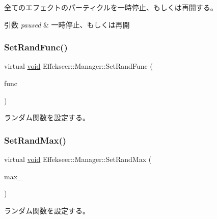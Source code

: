 全てのエフェクトのパーティクルを一時停止、もしくは再開する。 


\begin{DoxyParams}{引数}
{\em paused} & 一時停止、もしくは再開 \\
\hline
\end{DoxyParams}
\mbox{\label{class_effekseer_1_1_manager_acff5857772ae9674b6f96ffd4de28f69}} 
\subsubsection{\texorpdfstring{Set\+Rand\+Func()}{SetRandFunc()}}
{\footnotesize\ttfamily virtual \mbox{\hyperlink{namespace_effekseer_ab34c4088e512200cf4c2716f168deb56}{void}} Effekseer\+::\+Manager\+::\+Set\+Rand\+Func (\begin{DoxyParamCaption}\item[{Rand\+Func}]{func }\end{DoxyParamCaption})\hspace{0.3cm}{\ttfamily [pure virtual]}}



ランダム関数を設定する。 

\mbox{\label{class_effekseer_1_1_manager_ad2e4e1458d5e1091f5cb8073ae8e60eb}} 
\subsubsection{\texorpdfstring{Set\+Rand\+Max()}{SetRandMax()}}
{\footnotesize\ttfamily virtual \mbox{\hyperlink{namespace_effekseer_ab34c4088e512200cf4c2716f168deb56}{void}} Effekseer\+::\+Manager\+::\+Set\+Rand\+Max (\begin{DoxyParamCaption}\item[{\mbox{\hyperlink{namespace_effekseer_ace0abf7c2e6947e519ebe8b54cbcc30a}{int}}}]{max\+\_\+ }\end{DoxyParamCaption})\hspace{0.3cm}{\ttfamily [pure virtual]}}



ランダム関数を設定する。 

